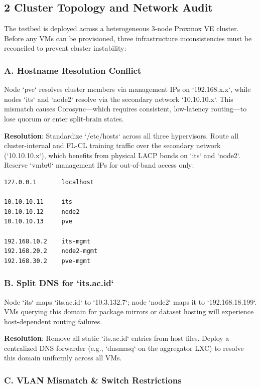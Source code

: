 \documentclass[conference]{IEEEtran}
\begin{document}
\subsection{2 Cluster Topology and Network Audit}

The testbed is deployed across a heterogeneous 3-node Proxmox VE cluster. Before any VMs can be provisioned, three infrastructure inconsistencies must be reconciled to prevent cluster instability:


\subsubsection{A. Hostname Resolution Conflict}

Node `pve` resolves cluster members via management IPs on `192.168.x.x`, while nodes `its` and `node2` resolve via the secondary network `10.10.10.x`. This mismatch causes Corosync—which requires consistent, low-latency routing—to lose quorum or enter split-brain states.

\textbf{Resolution}: Standardize `/etc/hosts` across all three hypervisors. Route all cluster-internal and FL-CL training traffic over the secondary network (`10.10.10.x`), which benefits from physical LACP bonds on `its` and `node2`. Reserve `vmbr0` management IPs for out-of-band access only:

\begin{verbatim}
127.0.0.1       localhost

10.10.10.11     its
10.10.10.12     node2
10.10.10.13     pve

192.168.10.2    its-mgmt
192.168.20.2    node2-mgmt
192.168.30.2    pve-mgmt
\end{verbatim}


\subsubsection{B. Split DNS for `its.ac.id`}

Node `its` maps `its.ac.id` to `10.3.132.7`; node `node2` maps it to `192.168.18.199`. VMs querying this domain for package mirrors or dataset hosting will experience host-dependent routing failures.

\textbf{Resolution}: Remove all static `its.ac.id` entries from host files. Deploy a centralized DNS forwarder (e.g., `dnsmasq` on the aggregator LXC) to resolve this domain uniformly across all VMs.


\subsubsection{C. VLAN Mismatch & Switch Restrictions}
\end{document}
